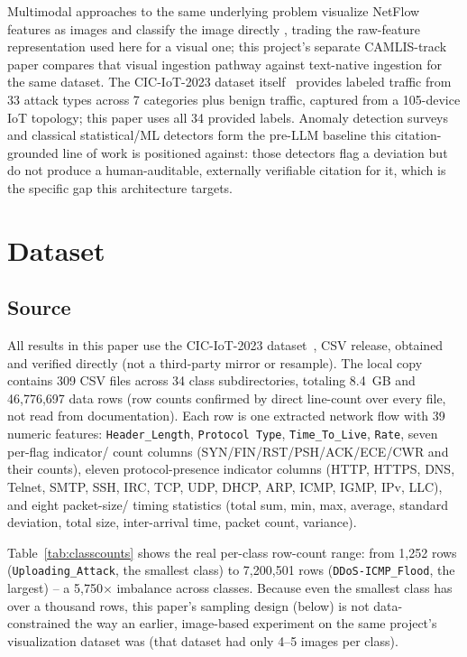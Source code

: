 \documentclass[11pt]{article}
\begin{document}
Multimodal approaches to the same underlying problem visualize NetFlow
features as images and classify the image directly
\citep{netflowviz}, trading the raw-feature representation used here for a
visual one; this project's separate CAMLIS-track paper compares that visual
ingestion pathway against text-native ingestion for the same dataset. The
CIC-IoT-2023 dataset itself~\citep{neto2023ciciot2023} provides labeled
traffic from 33 attack types across 7 categories plus benign traffic,
captured from a 105-device IoT topology; this paper uses all 34 provided
labels. Anomaly detection surveys~\citep{chandola2009anomaly} and classical
statistical/ML detectors form the pre-LLM baseline this citation-grounded
line of work is positioned against: those detectors flag a deviation but do
not produce a human-auditable, externally verifiable citation for it, which
is the specific gap this architecture targets.

\section{Dataset}
\label{sec:dataset}

\subsection{Source}

All results in this paper use the CIC-IoT-2023
dataset~\citep{neto2023ciciot2023}, CSV release, obtained and verified
directly (not a third-party mirror or resample). The local copy contains
309 CSV files across 34 class subdirectories, totaling 8.4~GB and
46{,}776{,}697 data rows (row counts confirmed by direct line-count over
every file, not read from documentation). Each row is one extracted network
flow with 39 numeric features: \texttt{Header\_Length}, \texttt{Protocol
Type}, \texttt{Time\_To\_Live}, \texttt{Rate}, seven per-flag indicator/
count columns (SYN/FIN/RST/PSH/ACK/ECE/CWR and their counts), eleven
protocol-presence indicator columns (HTTP, HTTPS, DNS, Telnet, SMTP, SSH,
IRC, TCP, UDP, DHCP, ARP, ICMP, IGMP, IPv, LLC), and eight packet-size/
timing statistics (total sum, min, max, average, standard deviation, total
size, inter-arrival time, packet count, variance).

Table~\ref{tab:classcounts} shows the real per-class row-count range: from
1{,}252 rows (\texttt{Uploading\_Attack}, the smallest class) to
7{,}200{,}501 rows (\texttt{DDoS-ICMP\_Flood}, the largest) -- a
5{,}750$\times$ imbalance across classes. Because even the smallest class
has over a thousand rows, this paper's sampling design (below) is not
data-constrained the way an earlier, image-based experiment on the same
project's visualization dataset was (that dataset had only 4--5 images per
class).
\end{document}
